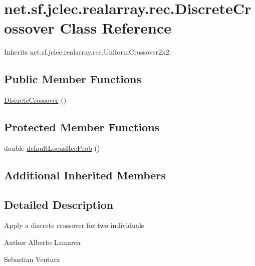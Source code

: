 \hypertarget{classnet_1_1sf_1_1jclec_1_1realarray_1_1rec_1_1_discrete_crossover}{\section{net.\-sf.\-jclec.\-realarray.\-rec.\-Discrete\-Crossover Class Reference}
\label{classnet_1_1sf_1_1jclec_1_1realarray_1_1rec_1_1_discrete_crossover}
}


Inherits net.\-sf.\-jclec.\-realarray.\-rec.\-Uniform\-Crossover2x2.

\subsection*{Public Member Functions}
\begin{DoxyCompactItemize}
\item 
\hyperlink{classnet_1_1sf_1_1jclec_1_1realarray_1_1rec_1_1_discrete_crossover_a0a377b112bf90cf286219321cc9a4315}{Discrete\-Crossover} ()
\end{DoxyCompactItemize}
\subsection*{Protected Member Functions}
\begin{DoxyCompactItemize}
\item 
double \hyperlink{classnet_1_1sf_1_1jclec_1_1realarray_1_1rec_1_1_discrete_crossover_aa16427826e1cd4c046f6c0049f8fe68f}{default\-Locus\-Rec\-Prob} ()
\end{DoxyCompactItemize}
\subsection*{Additional Inherited Members}


\subsection{Detailed Description}
Apply a discrete crossover for two individuals

\begin{DoxyAuthor}{Author}
Alberto Lamarca 

Sebastian Ventura 
\end{DoxyAuthor}


